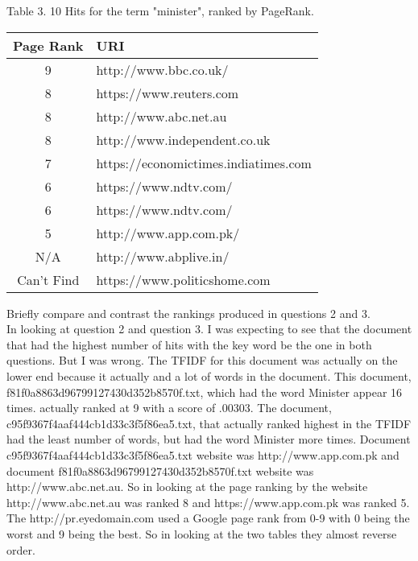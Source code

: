 \documentclass[10pt,letterpaper]{article}
\begin{document}
Table 3. 10 Hits for the term "minister", ranked by PageRank.\\
\begin{center}
  \begin{tabular}{ | c | l}
    \hline
   Page Rank & URI\\ \hline
    9 & http://www.bbc.co.uk/\\ \hline 
    8 & https://www.reuters.com\\ \hline
    8 & http://www.abc.net.au \\ \hline
    8 & http://www.independent.co.uk \\ \hline
    7 & https://economictimes.indiatimes.com\\ \hline   
    6 & https://www.ndtv.com/ \\ \hline 
    6 & https://www.ndtv.com/ \\ \hline    
    5 & http://www.app.com.pk/ \\ \hline
    N/A & http://www.abplive.in/ \\ \hline
    Can't Find & https://www.politicshome.com \\ \hline        
    \hline
  \end{tabular}
\end{center}

Briefly compare and contrast the rankings produced in questions 2
and 3.\\

In looking at question 2 and question 3.  I was expecting to see that the document that had the highest number of hits with the key word be the one in both questions.  But I was wrong.  The TFIDF for this document was actually on the lower end because it actually and a lot of words in the document.  This document, f81f0a8863d96799127430d352b8570f.txt, which had the word Minister appear 16 times.  actually ranked at 9 with a score of .00303.  The document, c95f9367f4aaf444cb1d33c3f5f86ea5.txt, that actually ranked highest in the TFIDF had the least number of words, but had the word Minister more times.  Document c95f9367f4aaf444cb1d33c3f5f86ea5.txt website was http://www.app.com.pk and document f81f0a8863d96799127430d352b8570f.txt website was http://www.abc.net.au.  So in looking at the page ranking by the website http://www.abc.net.au was ranked 8 and https://www.app.com.pk was ranked 5.  The http://pr.eyedomain.com used a Google page rank from 0-9 with 0 being the worst and 9 being the best.  So in looking at the two tables they almost reverse order.\\
\end{document}
